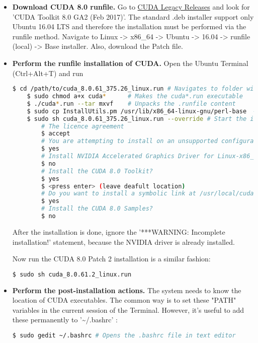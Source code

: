\begin{itemize}
	\item \textbf{Download CUDA 8.0 runfile.} Go to \href{https://developer.nvidia.com/cuda-80-ga2-download-archive}{CUDA Legacy Releases} and look for 'CUDA Toolkit 8.0 GA2 (Feb 2017)'. The standard .deb installer support only Ubuntu 16.04 LTS and therefore the installation must be performed via the runfile method. Navigate to Linux -> x86\_64 -> Ubuntu -> 16.04 -> runfile (local) -> Base installer. Also, download the Patch file. 
	
	\item \textbf{Perform the runfile installation of CUDA.} Open the Ubuntu Terminal (Ctrl+Alt+T) and run
	
	\begin{lstlisting}[language=bash]
	$ cd /path/to/cuda_8.0.61_375.26_linux.run # Navigates to folder with CUDA
	$ sudo chmod a+x cuda*		# Makes the cuda*.run executable
	$ ./cuda*.run --tar mxvf 	# Unpacks the .runfile content
	$ sudo cp InstallUtils.pm /usr/lib/x86_64-linux-gnu/perl-base  # Copy one of the extracted files to perl-base
	$ sudo sh cuda_8.0.61_375.26_linux.run --override # Start the installation 
		# The licence agreement
		$ accept 
		# You are attempting to install on an unsupported configuration. Do you wish to continue?
		$ yes 
		# Install NVIDIA Accelerated Graphics Driver for Linux-x86_64 375.26?
		$ no
		# Install the CUDA 8.0 Toolkit?
		$ yes 
		$ <press enter> (leave deafult location)
		# Do you want to install a symbolic link at /usr/local/cuda?
		$ yes
		# Install the CUDA 8.0 Samples?
		$ no
	\end{lstlisting}
	
	After the installation is done, ignore the '***WARNING: Incomplete installation!' statement, because the NVIDIA driver is already installed. 
	
	Now run the CUDA 8.0 Patch 2 installation is a similar fashion:
	
	\begin{lstlisting}[language=bash]
	$ sudo sh cuda_8.0.61.2_linux.run
	\end{lstlisting}
	
	\item \textbf{Perform the post-installation actions.} The system needs to know the location of CUDA executables. The common way is to set these "PATH" variables in the current session of the Terminal. However, it's useful to add these permanently to '\textasciitilde{}/.bashrc' :
		
	\begin{lstlisting}[language=bash]
	$ sudo gedit ~/.bashrc # Opens the .bashrc file in text editor
	\end{lstlisting}
	

\end{itemize}
